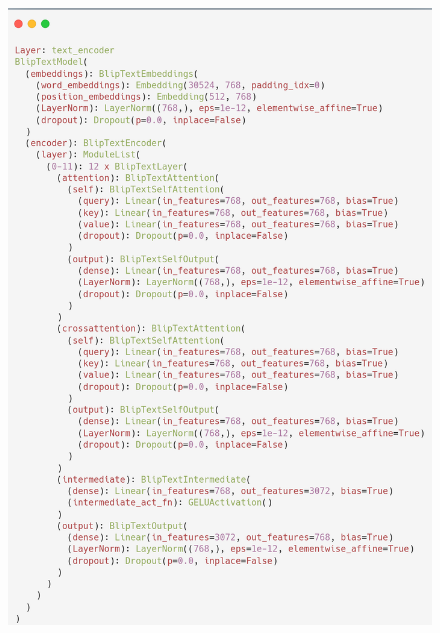 \begin{figure}[H]
  \centering
  \includegraphics[width=\textwidth]{image/lampiran/blip-text-encoder.png}
  \label{fig:layer-text-encoder-blip}
\end{figure}


